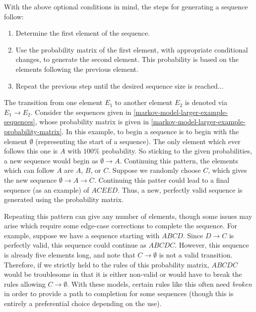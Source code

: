 With the above optional conditions in mind, the steps for generating a sequence follow:
\begin{enumerate}\itemsep0em
	\item Determine the first element of the sequence.
	\item Use the probability matrix of the first element, with appropriate conditional changes, to generate the second element. This probability is based on the elements following the previous element.
	\item Repeat the previous step until the desired sequence size is reached... 
\end{enumerate}

The transition from one element $E_1$ to another element $E_2$ is denoted via $E_1\rightarrow E_2$.  Consider the sequences given in \ref{markov-model-larger-example-sequences}, whose probability matrix is given in \ref{markov-model-larger-example-probability-matrix}. In this example, to begin a sequence is to begin with the element $\emptyset$ (representing the start of a sequence). The only element which ever follows this one is $A$ with $100\%$ probability. So sticking to the given probabilities, a new sequence would begin as $\emptyset\rightarrow A$. Continuing this pattern, the elements which can follow $A$ are $A$, $B$, or $C$. Suppose we randomly choose $C$, which gives the new sequence $\emptyset\rightarrow A\rightarrow C$. Continuing this patter could lead to a final sequence (as an example) of $ACEED$. Thus, a new, perfectly valid sequence is generated using the probability matrix. 

Repeating this pattern can give any number of elements, though some issues may arise which require some edge-case corrections to complete the sequence. For example, suppose we have a sequence starting with $ABCD$. Since $D\rightarrow C$ is perfectly valid, this sequence could continue as $ABCDC$. However, this sequence is already five elements long, and note that $C\rightarrow\emptyset$ is not a valid transition. Therefore, if we strictly held to the rules of this probability matrix, $ABCDC$ would be troublesome in that it is either non-valid or would have to break the rules allowing $C\rightarrow\emptyset$. With these models, certain rules like this often need \textit{broken} in order to provide a path to completion for some sequences (though this is entirely a preferential choice depending on the use).























